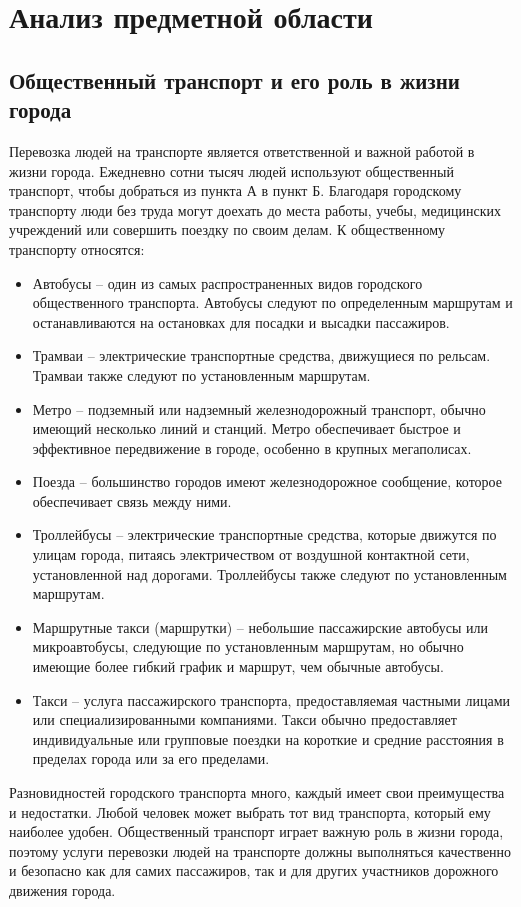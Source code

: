 \section{Анализ предметной области}
\subsection{Общественный транспорт и его роль в жизни города}

Перевозка людей на транспорте является ответственной и важной работой в жизни города. Ежедневно сотни тысяч людей используют общественный транспорт, чтобы добраться из пункта А в пункт Б. Благодаря городскому транспорту люди без труда могут доехать до места работы, учебы, медицинских учреждений или совершить поездку по своим делам. К общественному транспорту относятся:
\begin{itemize}
	\item Автобусы -- один из самых распространенных видов городского общественного транспорта. Автобусы следуют по определенным маршрутам и останавливаются на остановках для посадки и высадки пассажиров.
	\item Трамваи -- электрические транспортные средства, движущиеся по рельсам. Трамваи также следуют по установленным маршрутам.
	\item Метро -- подземный или надземный железнодорожный транспорт, обычно имеющий несколько линий и станций. Метро обеспечивает быстрое и эффективное передвижение в городе, особенно в крупных мегаполисах.
	\item Поезда -- большинство городов имеют железнодорожное сообщение, которое обеспечивает связь между ними.
	\item Троллейбусы -- электрические транспортные средства, которые движутся по улицам города, питаясь электричеством от воздушной контактной сети, установленной над дорогами. Троллейбусы также следуют по установленным маршрутам.
	\item Маршрутные такси (маршрутки) -- небольшие пассажирские автобусы или микроавтобусы, следующие по установленным маршрутам, но обычно имеющие более гибкий график и маршрут, чем обычные автобусы.
	\item Такси -- услуга пассажирского транспорта, предоставляемая частными лицами или специализированными компаниями. Такси обычно предоставляет индивидуальные или групповые поездки на короткие и средние расстояния в пределах города или за его пределами.
\end{itemize}

 Разновидностей городского транспорта много, каждый имеет свои преимущества и недостатки. Любой человек может выбрать тот вид транспорта, который ему наиболее удобен. Общественный транспорт играет важную роль в жизни города, поэтому услуги перевозки людей на транспорте должны выполняться качественно и безопасно как для самих пассажиров, так и для других участников дорожного движения города.

